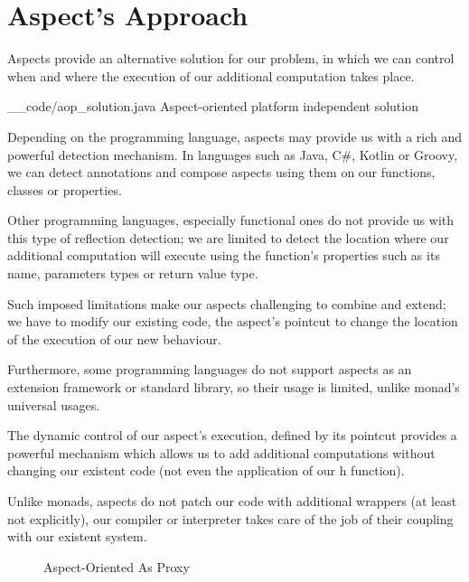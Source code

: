 
\section{Aspect's Approach}
\label{sec::aop}

Aspects provide an alternative solution for our problem, in which we can control when and where the execution of our additional computation takes place.

    {__code/aop_solution.java}
    {Aspect-oriented platform independent solution}
\label{fig::aop::solution}

Depending on the programming language, aspects may provide us with a rich and powerful detection mechanism. In languages such as Java, C\#, Kotlin or Groovy, we can detect annotations and compose aspects using them on our functions, classes or properties.

Other programming languages, especially functional ones do not provide us with this type of reflection detection; we are limited to detect the location where our additional computation will execute using the function's properties such as its name, parameters types or return value type. 

Such imposed limitations make our aspects challenging to combine and extend; we have to modify our existing code, the aspect's pointcut to change the location of the execution of our new behaviour. 

Furthermore, some programming languages do not support aspects as an extension framework or standard library, so their usage is limited, unlike monad's universal usages.
 
The dynamic control of our aspect's execution, defined by its pointcut provides a powerful mechanism which allows us to add additional computations without changing our existent code (not even the application of our h function).

Unlike monads, aspects do not patch our code with additional wrappers (at least not explicitly), our compiler or interpreter takes care of the job of their coupling with our existent system.

\begin{figure}
    \centering
    
    \caption{Aspect-Oriented As Proxy}
    \label{fig::gateway::oop}
\end{figure}
